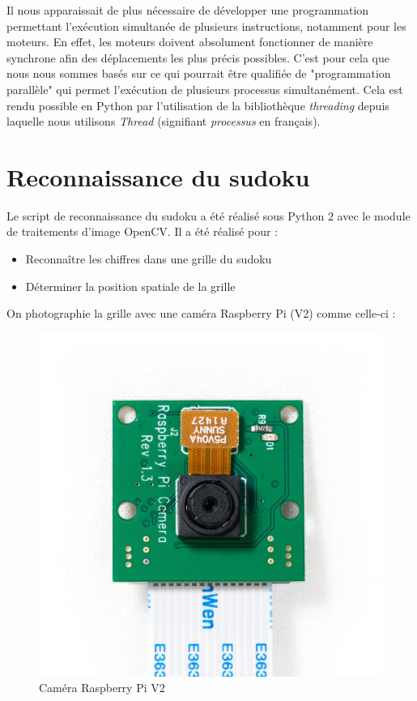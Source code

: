 \documentclass[12pt,a4paper]{report}
\begin{document}
	Il nous apparaissait de plus nécessaire de développer une programmation permettant l'exécution simultanée de plusieurs instructions, notamment pour les moteurs. En effet, les moteurs doivent absolument fonctionner de manière synchrone afin des déplacements les plus précis possibles. C'est pour cela que nous nous sommes basés sur ce qui pourrait être qualifiée de "programmation parallèle" qui permet l'exécution de plusieurs processus simultanément. Cela est rendu possible en Python par l'utilisation de la bibliothèque \emph{threading} depuis laquelle nous utilisons \emph{Thread} (signifiant \emph{processus} en français).
	
\newpage
\section{Reconnaissance du sudoku}
	Le script de reconnaissance du sudoku a été réalisé sous Python 2 avec le module de traitements d'image OpenCV. Il a été réalisé pour :
	\begin{itemize}[label=--]
	\item Reconnaître les chiffres dans une grille du sudoku
	\item Déterminer la position spatiale de la grille
	\end{itemize}
	On photographie la grille avec une caméra Raspberry Pi (V2) comme celle-ci :
\begin{figure}[!h]
 \center
 \includegraphics[scale=0.2]{../pictures/camera.jpg}
 \caption{Caméra Raspberry Pi V2}
\end{figure}
\end{document}
